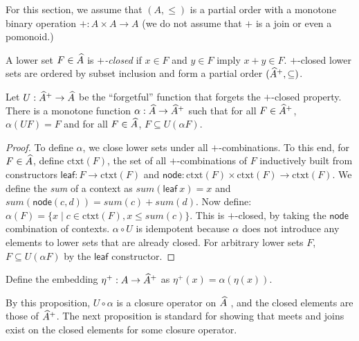 For this section, we assume that $(A, \leq)$ is a partial order with a
monotone binary operation $+ : A \times A \to A$ (we do not assume
that $+$ is a join or even a pomonoid.)

\begin{definition}
  A lower set $F \in \widehat{A}$ is \emph{$+$-closed} if $x \in F$
  and $y \in F$ imply $x + y \in F$. $+$-closed lower sets are ordered
  by subset inclusion and form a partial order
  $(\widehat{A}^+, \subseteq)$.
\end{definition}

\begin{proposition}
  Let $U : \widehat{A}^+ \to \widehat{A}$ be the ``forgetful''
  function that forgets the $+$-closed property. There is a monotone
  function $\alpha : \widehat{A} \to \widehat{A}^+$ such that
  for all $F \in \widehat{A}^+$, $\alpha(U F) = F$ and for all
  $F \in \widehat{A}$, $F \subseteq U (\alpha F)$.
\end{proposition}

\begin{proof}
  To define $\alpha$, we close lower sets under all
  $+$-combinations. To this end, for $F \in \widehat{A}$, define
  $\mathrm{ctxt}(F)$, the set of all $+$-combinations of $F$
  inductively built from constructors
  $\mathsf{leaf} : F \to \mathrm{ctxt}(F)$ and
  $\mathsf{node} : \mathrm{ctxt}(F) \times \mathrm{ctxt}(F) \to
    \mathrm{ctxt}(F)$. We define the \emph{sum} of a context as
  $\mathit{sum}(\mathsf{leaf}~x) = x$ and
  $\mathit{sum}(\mathsf{node}(c,d)) = \mathit{sum}(c) +
    \mathit{sum}(d)$. Now define:
  $\alpha(F) = \{ x \mid c \in \mathrm{ctxt}(F), x \leq
    \mathit{sum}(c) \}$. This is $+$-closed, by taking the
  $\mathsf{node}$ combination of contexts. $\alpha \circ U$ is
  idempotent because $\alpha$ does not introduce any elements to lower
  sets that are already closed. For arbitrary lower sets $F$,
  $F \subseteq U(\alpha F)$ by the $\mathsf{leaf}$ constructor.
\end{proof}

\begin{definition}
  Define the embedding $\eta^+ : A \to \widehat{A}^+$ as
  $\eta^+(x) = \alpha(\eta(x))$.
\end{definition}

\begin{remark}
  By this proposition, $U \circ \alpha$ is a closure operator on
  $\widehat{A}$ \cite{Davey_2002}, and the closed elements are
  those of $\widehat{A}^+$. The next proposition is standard for
  showing that meets and joins exist on the closed elements for some
  closure operator.
\end{remark}

